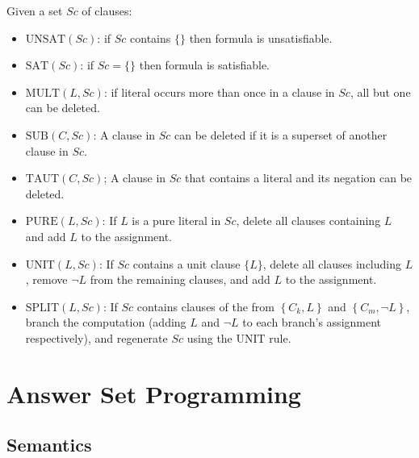 \documentclass[twocolumn,english]{article}
\begin{document}
Given a set $Sc$ of clauses: 
\begin{itemize}
\item $\text{UNSAT}\left(Sc\right)$: if $Sc$ contains $\{\}$ then formula
is unsatisfiable. 
\item $\text{SAT}\left(Sc\right)$: if $Sc=\{\}$ then formula is satisfiable. 
\item $\text{MULT}\left(L,Sc\right)$: if literal occurs more than once
in a clause in $Sc$, all but one can be deleted. 
\item $\text{SUB}\left(C,Sc\right)$: A clause in $Sc$ can be deleted if
it is a superset of another clause in $Sc$. 
\item $\text{TAUT}\left(C,Sc\right)$; A clause in $Sc$ that contains a
literal and its negation can be deleted. 
\item $\text{PURE}\left(L,Sc\right)$: If $L$ is a pure literal in $Sc$,
delete all clauses containing $L$ and add $L$ to the assignment. 
\item $\text{UNIT}\left(L,Sc\right)$: If $Sc$ contains a unit clause $\{L\}$,
delete all clauses including $L$, remove $\lnot L$ from the remaining
clauses, and add $L$ to the assignment. 
\item $\text{SPLIT}\left(L,Sc\right)$: If $Sc$ contains clauses of the
from $\left\{ C_{k},L\right\} $ and $\left\{ C_{m},\lnot L\right\} $,
branch the computation (adding $L$ and $\lnot L$ to each branch's
assignment respectively), and regenerate $Sc$ using the UNIT rule. 
\end{itemize}

\section{Answer Set Programming}

\subsection{Semantics}
\end{document}
